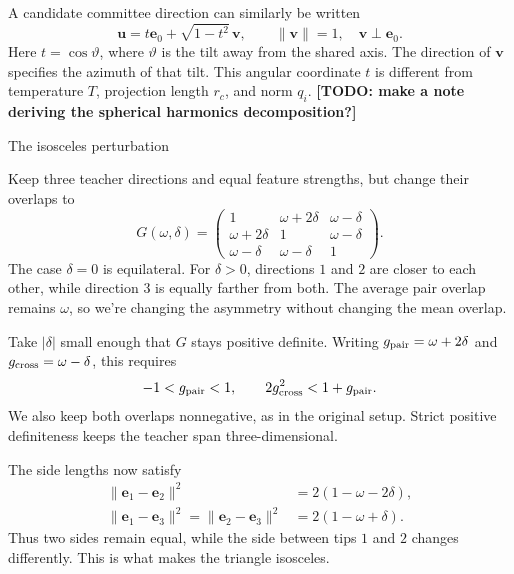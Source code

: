 \documentclass[11pt, reqno]{amsart}
\makeatletter
\def\section{\@startsection{section}{1}%
  \z@{.7\linespacing\@plus\linespacing}{.5\linespacing}%
  {\normalfont\scshape\centering}}
\theoremstyle{notestyle}
\theoremstyle{defstyle}
\makeatother
\begin{document}
A candidate committee direction can similarly be written
\begin{equation}
 \mathbf u=t\mathbf e_0+\sqrt{1-t^2}\,\mathbf v,\qquad
 \|\mathbf v\|=1,\quad \mathbf v\perp\mathbf e_0.
\end{equation}
Here $t=\cos\vartheta$, where $\vartheta$ is the tilt away from the
shared axis. The direction of $\mathbf v$ specifies the azimuth of
that tilt. This angular coordinate $t$ is different from temperature
$T$, projection length $r_c$, and norm $q_i$. \color{blue}\textbf{[TODO: make a note deriving the spherical harmonics decomposition?]}\color{black}

\section{The isosceles perturbation}

Keep three teacher directions and equal feature strengths, but change
their overlaps to
\begin{equation}
 G(\omega,\delta)=
 \begin{pmatrix}
 1&\omega+2\delta&\omega-\delta\\
 \omega+2\delta&1&\omega-\delta\\
 \omega-\delta&\omega-\delta&1
 \end{pmatrix}.
 \label{eq:iso-G}
\end{equation}
The case $\delta=0$ is equilateral. For $\delta>0$, directions $1$
and $2$ are closer to each other, while direction $3$ is equally
farther from both. The average pair overlap remains $\omega$, so
we're changing the asymmetry without changing the mean overlap.

Take $|\delta|$ small enough that $G$ stays positive definite. Writing
$g_{\rm pair}=\omega+2\delta$ and $g_{\rm cross}=\omega-\delta$, this
requires
\begin{equation}
 -1<g_{\rm pair}<1,\qquad
 2g_{\rm cross}^2<1+g_{\rm pair}.
\end{equation}
We also keep both overlaps nonnegative, as in the original setup.
Strict positive definiteness keeps the teacher span three-dimensional.

The side lengths now satisfy
\begin{align}
 \|\mathbf e_1-\mathbf e_2\|^2&=2(1-\omega-2\delta),\\
 \|\mathbf e_1-\mathbf e_3\|^2
 =\|\mathbf e_2-\mathbf e_3\|^2&=2(1-\omega+\delta).
\end{align}
Thus two sides remain equal, while the side between tips $1$ and $2$
changes differently. This is what makes the triangle isosceles.
\end{document}
